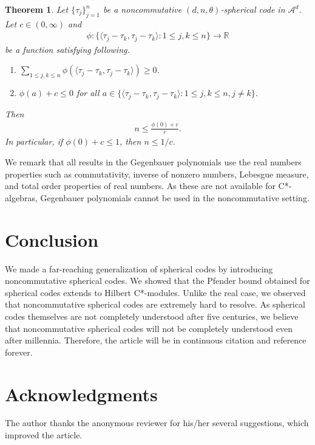 \documentclass{amsart}
\newtheorem{theorem}{Theorem}[section]
\begin{document}
\begin{theorem}
	Let $\{\tau_j\}_{j=1}^n$  be a  noncommutative $(d,n,\theta )$-spherical code in $\mathcal{A}^d$. Let $c\in (0, \infty)$ and 
	\begin{align*}
		\phi:\{\langle \tau_j-\tau_k, \tau_j-\tau_k\rangle:1\leq j, k \leq n\}\to \mathbb{R}	
	\end{align*}
	be a function satisfying following.
	\begin{enumerate}[\upshape(i)]
		\item $\sum_{1\leq j,k \leq n}\phi(\langle \tau_j-\tau_k, \tau_j-\tau_k\rangle)\geq 0$.
		\item $\phi(a)+c\leq 0$ for all $ a \in \{\langle \tau_j-\tau_k, \tau_j-\tau_k\rangle:1\leq j, k \leq n, j \neq k\}$.
	\end{enumerate}
	Then 
	\begin{align*}
		n\leq \frac{\phi(0)+c}{c}.
	\end{align*}
	In particular, if $\phi(0)+c\leq 1$, then $n\leq 1/c$.	
\end{theorem}
We remark that all results in the Gegenbauer polynomials use the real numbers properties such as commutativity, inverse of nonzero numbers, Lebesgue measure, and total order properties of real numbers. As these are not available for C*-algebras, Gegenbauer polynomials cannot be used in the noncommutative setting.

\section{Conclusion}
We made a far-reaching generalization of spherical codes by introducing noncommutative spherical codes. We showed that the Pfender bound obtained for spherical codes extends to Hilbert C*-modules. Unlike the real case, we observed that noncommutative spherical codes are extremely hard to resolve. As spherical codes themselves are not completely understood after five centuries, we believe that noncommutative spherical codes will not be completely understood even after millennia. Therefore, the article will be in continuous citation and reference forever.

\section{Acknowledgments} 
The author thanks the anonymous reviewer for his/her several suggestions, which improved the article.




































 
 
 
\end{document}
